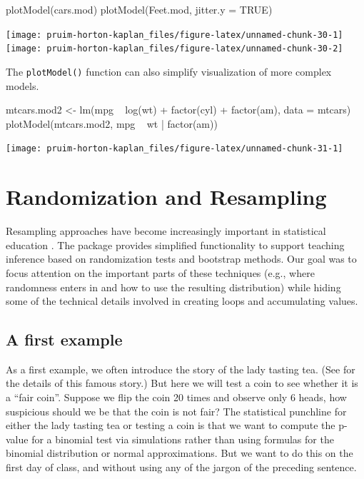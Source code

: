 \begin{Schunk}
\begin{Sinput}
plotModel(cars.mod)
plotModel(Feet.mod, jitter.y = TRUE)
\end{Sinput}


\begin{center}\texttt{[image: pruim-horton-kaplan\_files/figure-latex/unnamed-chunk-30-1]} \texttt{[image: pruim-horton-kaplan\_files/figure-latex/unnamed-chunk-30-2]} \end{center}

\end{Schunk}

\noindent
The \texttt{plotModel()} function can also simplify visualization of
more complex models.

\begin{Schunk}
\begin{Sinput}
mtcars.mod2 <- lm(mpg ~ log(wt) + factor(cyl) + factor(am), data = mtcars)
plotModel(mtcars.mod2, mpg ~ wt | factor(am))
\end{Sinput}


\begin{center}\texttt{[image: pruim-horton-kaplan\_files/figure-latex/unnamed-chunk-31-1]} \end{center}

\end{Schunk}

\section{Randomization and
Resampling}\label{randomization-and-resampling}

Resampling approaches have become increasingly important in statistical
education \citep{Tintle:TAS:2015, Hesterberg:2015}. The 
package provides simplified functionality to support teaching inference
based on randomization tests and bootstrap methods. Our goal was to
focus attention on the important parts of these techniques (e.g., where
randomness enters in and how to use the resulting distribution) while
hiding some of the technical details involved in creating loops and
accumulating values.

\subsection{A first example}\label{a-first-example}

As a first example, we often introduce the story of the lady tasting
tea. (See \cite{Salsburg:2002} for the details of this famous story.)
But here we will test a coin to see whether it is a ``fair coin''.
Suppose we flip the coin 20 times and observe only 6 heads, how
suspicious should we be that the coin is not fair? The statistical
punchline for either the lady tasting tea or testing a coin is that we
want to compute the p-value for a binomial test via simulations rather
than using formulas for the binomial distribution or normal
approximations. But we want to do this on the first day of class, and
without using any of the jargon of the preceding sentence.

